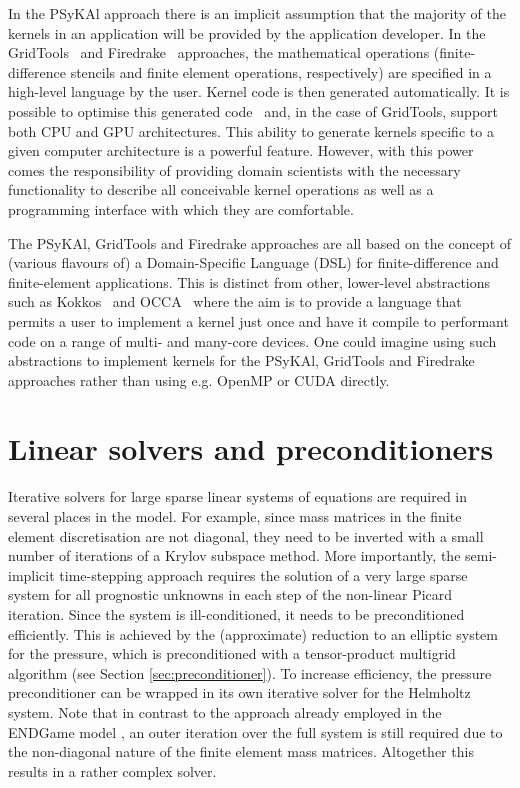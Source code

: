 \documentclass[times]{elsarticle}
\begin{document}
In the {PS}y{KA}l approach there is an implicit assumption that the
majority of the kernels in an application will be provided by the
application developer. In the GridTools~\citep{grid_tools} and
Firedrake~\citep{firedrake,fenics} approaches, the mathematical
operations (finite-difference stencils and finite element operations,
respectively) are specified in a high-level language by the
user. Kernel code is then generated automatically. It is possible to
optimise this generated code~\citep{coffee} and, in the case of
GridTools, support both CPU and GPU architectures. This ability to
generate kernels specific to a given computer architecture is a
powerful feature. However, with this power comes the responsibility of
providing domain scientists with the necessary functionality to
describe all conceivable kernel operations as well as a programming
interface with which they are comfortable.

The {PS}y{KA}l, GridTools and Firedrake approaches are all based on
the concept of (various flavours of) a Domain-Specific Language (DSL)
for finite-difference and finite-element applications. This is
distinct from other, lower-level abstractions such as
Kokkos~\citep{kokkos} and OCCA~\citep{occa} where the aim is to
provide a language that permits a user to implement a kernel just once
and have it compile to performant code on a range of multi- and
many-core devices. One could imagine using such abstractions to
implement kernels for the {PS}y{KA}l, GridTools and Firedrake
approaches rather than using e.g. OpenMP or CUDA directly.

\section{\label{sec:Solver}Linear solvers and preconditioners}
Iterative solvers for large sparse linear systems of equations are
required in several places in the model. For example, since mass
matrices in the finite element discretisation are not diagonal, they
need to be inverted with a small number of iterations of a Krylov
subspace method. More importantly, the semi-implicit time-stepping
approach requires the solution of a very large sparse system for all
prognostic unknowns in each step of the non-linear Picard
iteration. Since the system is ill-conditioned, it needs to be
preconditioned efficiently. This is achieved by the (approximate)
reduction to an elliptic system for the pressure, which is
preconditioned with a tensor-product multigrid algorithm
\cite{Borm2001} (see Section \ref{sec:preconditioner}). To increase
efficiency, the pressure preconditioner can be wrapped in its own
iterative solver for the Helmholtz system. Note that in contrast to
the approach already employed in the ENDGame model \cite{QJ:QJ2235},
an outer iteration over the full system is still required due to the
non-diagonal nature of the finite element mass matrices. Altogether
this results in a rather complex solver.
\end{document}
